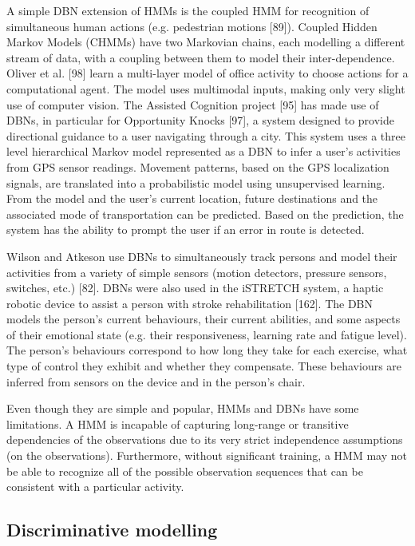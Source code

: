 A simple DBN extension of HMMs is the coupled HMM for recognition of simultaneous human actions (e.g. pedestrian motions [89]). Coupled Hidden Markov Models (CHMMs) have two Markovian chains, each modelling a different stream of data, with a coupling between them to model their inter-dependence. Oliver et al. [98] learn a multi-layer model of office activity to choose actions for a computational agent. The model uses multimodal inputs, making only very slight use of computer vision. The Assisted Cognition project [95] has made use of DBNs, in particular for Opportunity Knocks [97], a system designed to provide directional guidance to a user navigating through a city. This system uses a three level hierarchical Markov model represented as a DBN to infer a user’s activities from GPS sensor readings. Movement patterns, based on the GPS localization signals, are translated into a probabilistic model using unsupervised learning. From the model and the user’s current location, future destinations and the associated mode of transportation can be predicted. Based on the prediction, the system has the ability to prompt the user if an error in route is detected.

Wilson and Atkeson use DBNs to simultaneously track persons and model their activities from a variety of simple sensors (motion detectors, pressure sensors, switches, etc.) [82]. DBNs were also used in the iSTRETCH system, a haptic robotic device to assist a person with stroke rehabilitation [162]. The DBN models the person’s current behaviours, their current abilities, and some aspects of their emotional state (e.g. their responsiveness, learning rate and fatigue level). The person’s behaviours correspond to how long they take for each exercise, what type of control they exhibit and whether they compensate. These behaviours are inferred from sensors on the device and in the person’s chair.

Even though they are simple and popular, HMMs and DBNs have some limitations. A HMM is incapable of capturing long-range or transitive dependencies of the observations due to its very strict independence assumptions (on the observations). Furthermore, without significant training, a HMM may not be able to recognize all of the possible observation sequences that can be consistent with a particular activity.

\subsection{Discriminative modelling}

